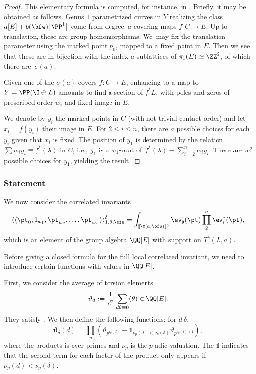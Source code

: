 \begin{proof}
This elementary formula is computed, for instance, in \cite{blomme2022floor}. Briefly, it may be obtained as follows. Genus $1$ parametrized curves in $Y$ realizing the class $a[E]+b(\bfw)\big[\PP^1\big]$ come from degree~$a$ covering maps $f\colon C\to E$. Up to translation, these are group homomorphisms. We~may fix the translation parameter using the marked point $p_0$, mapped to a fixed point in $E$.
Then we see that these are in bijection with the index $a$ sublattices of $\pi_1(E)\simeq\ZZ^2$, of which there are~$\sigma(a)$.

 Given one of the $\sigma(a)$ covers $f\colon C\to E$, enhancing to a map to $Y=\PP(\O\oplus L)$ amounts to find a section of $f^*L$, with poles and zeros of prescribed order $w_i$ and fixed image in $E$.

We denote by $y_i$ the %
marked points in $C$ (with not trivial contact order) and let $x_i=f(y_i)$ their image in $E$. For $2\leqslant i\leqslant n$, there are $a$ possible choices for each $y_i$ given that $x_i$ is fixed. The position of $y_1$ is determined by the relation $\sum w_iy_i\equiv f^*(\lambda)$ in $C$, i.e., $y_1$ is a $w_1$-root of~${f^*(\lambda)-\sum_{i=2}^nw_iy_i}$.
There are $w_1^2$ possible choices for $y_1$, yielding the result.
\end{proof}

\subsubsection{Statement} We now consider the correlated invariants
\[ \langle\langle \pt_0,1_{w_1},\pt_{w_2},\dots,\pt_{w_n}\rangle\rangle^\delta_{1,\beta,\bfw}
= \int_{[\![\M(a,\bfw)]\!]^\delta}\ev_0^*(\pt)\prod_2^n\ev_i^*(\pt), \]
which is an element of the group algebra $\QQ[E]$ with support on $T^\delta(L,a)$.



Before giving a closed formula for the full local correlated invariant, we need to introduce certain functions with values in $\QQ[E]$.

First, we consider the average of torsion elements
\[\vartheta_d:=\frac{1}{d^2}\sum_{d\theta\equiv 0}(\theta) \in\QQ[E].\]
They satisfy .
We then define the following functions: for $d|\delta$,
\[
 \boldsymbol{\vartheta}_\delta(d) = \prod_p (\vartheta_{p^{\nu_p(d)}}-\mathds{1}_{\nu_p(d)<\nu_p(\delta)}\vartheta_{p^{\nu_p(d)+1}} ),
 \]
where the products is over primes and $\nu_p$ is the $p$-adic valuation. The $\mathds{1}$ indicates that the second term for each factor of the product only appears if $\nu_p(d)<\nu_p(\delta)$.

